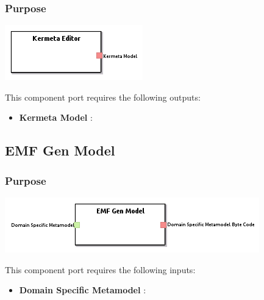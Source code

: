 \documentclass{gemoc} %
\begin{document}

\subsubsection{Purpose}

\begin{center}
\includegraphics*[trim=0.0cm 0.0cm 0cm 0.0cm, clip=true]{../images/generated/Generated_Kermeta_Editor.png}
\end{center}


This component port requires the following outputs:
\begin{itemize}
  \item \textbf{Kermeta Model} :
\end{itemize}

\subsection{EMF Gen Model}


\subsubsection{Purpose}

\begin{center}
\includegraphics*[trim=0.0cm 0.0cm 0cm 0.0cm, clip=true]{../images/generated/Generated_EMF_Gen_Model.png}
\end{center}

This component port requires the following inputs:
\begin{itemize}
  \item \textbf{Domain Specific Metamodel} :
\end{itemize}
\end{document}
